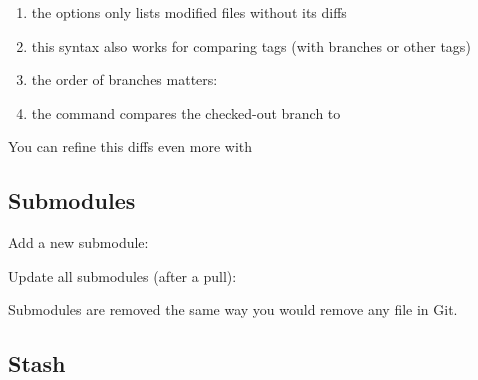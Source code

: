 \begin{enumerate}
	\item the  options only lists modified files without its diffs
	\item this syntax also works for comparing tags (with branches or other tags)
	\item the order of branches matters: 
	\item the command  compares the checked-out branch to 
\end{enumerate}

\begin{flushleft}
	You can refine this diffs even more with
\end{flushleft}

\begin{flushleft}
\end{flushleft}


\subsection{Submodules}\label{git-submodule}

\begin{flushleft}
	Add a new submodule:
\end{flushleft}

\begin{flushleft}
\end{flushleft}

\begin{flushleft}
	Update all submodules (after a pull):
\end{flushleft}

\begin{flushleft}
\end{flushleft}

\begin{flushleft}
	Submodules are removed the same way you would remove any file in Git.
\end{flushleft}


\subsection{Stash}\label{git-stash}

